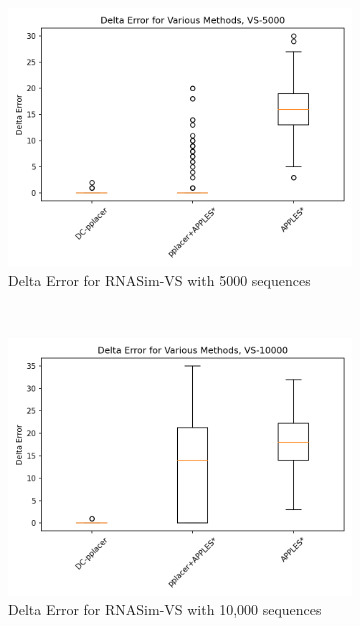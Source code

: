 \documentclass[10pt]{article}
\begin{document}
\begin{figure}[!htb]
\begin{subfigure}{0.5\textwidth}
\centering
\includegraphics[width=\textwidth]{Figs/VS-delta-error-5000-BW.png}
\caption{Delta Error for RNASim-VS with 5000 sequences}
\label{fig:error5000}
\end{subfigure}\\
\begin{subfigure}{0.5\textwidth}
\centering
\includegraphics[width=\textwidth]{Figs/VS-delta-error-10000-BW.png}
\caption{Delta Error for RNASim-VS with 10,000 sequences}
\label{fig:error10000}
\end{subfigure}\\
\begin{subfigure}{0.5\textwidth}
\centering

\end{subfigure}
\end{figure}
\end{document}
